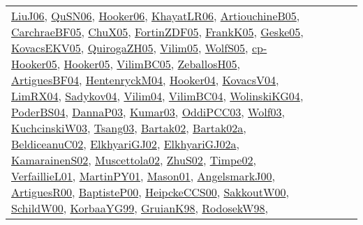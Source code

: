 {\begin{longtable}{lp{3cm}>{\raggedright}p{6cm}>{\raggedright}p{6cm}p{8cm}}
\href{papers/LiuJ06.pdf}{LiuJ06}\cite{LiuJ06}, \href{papers/QuSN06.pdf}{QuSN06}\cite{QuSN06}, \href{articles/Hooker06.pdf}{Hooker06}\cite{Hooker06}, \href{articles/KhayatLR06.pdf}{KhayatLR06}\cite{KhayatLR06}, \href{papers/ArtiouchineB05.pdf}{ArtiouchineB05}\cite{ArtiouchineB05}, \href{papers/CarchraeBF05.pdf}{CarchraeBF05}\cite{CarchraeBF05}, \href{papers/ChuX05.pdf}{ChuX05}\cite{ChuX05}, \href{papers/FortinZDF05.pdf}{FortinZDF05}\cite{FortinZDF05}, \href{papers/FrankK05.pdf}{FrankK05}\cite{FrankK05}, \href{papers/Geske05.pdf}{Geske05}\cite{Geske05}, \href{papers/KovacsEKV05.pdf}{KovacsEKV05}\cite{KovacsEKV05}, \href{papers/QuirogaZH05.pdf}{QuirogaZH05}\cite{QuirogaZH05}, \href{papers/Vilim05.pdf}{Vilim05}\cite{Vilim05}, \href{papers/WolfS05.pdf}{WolfS05}\cite{WolfS05}, \href{papers/cp-Hooker05.pdf}{cp-Hooker05}\cite{cp-Hooker05}, \href{articles/Hooker05.pdf}{Hooker05}\cite{Hooker05}, \href{articles/VilimBC05.pdf}{VilimBC05}\cite{VilimBC05}, \href{articles/ZeballosH05.pdf}{ZeballosH05}\cite{ZeballosH05}, \href{papers/ArtiguesBF04.pdf}{ArtiguesBF04}\cite{ArtiguesBF04}, \href{papers/HentenryckM04.pdf}{HentenryckM04}\cite{HentenryckM04}, \href{papers/Hooker04.pdf}{Hooker04}\cite{Hooker04}, \href{papers/KovacsV04.pdf}{KovacsV04}\cite{KovacsV04}, \href{papers/LimRX04.pdf}{LimRX04}\cite{LimRX04}, \href{papers/Sadykov04.pdf}{Sadykov04}\cite{Sadykov04}, \href{papers/Vilim04.pdf}{Vilim04}\cite{Vilim04}, \href{papers/VilimBC04.pdf}{VilimBC04}\cite{VilimBC04}, \href{papers/WolinskiKG04.pdf}{WolinskiKG04}\cite{WolinskiKG04}, \href{articles/PoderBS04.pdf}{PoderBS04}\cite{PoderBS04}, \href{papers/DannaP03.pdf}{DannaP03}\cite{DannaP03}, \href{papers/Kumar03.pdf}{Kumar03}\cite{Kumar03}, \href{papers/OddiPCC03.pdf}{OddiPCC03}\cite{OddiPCC03}, \href{papers/Wolf03.pdf}{Wolf03}\cite{Wolf03}, \href{articles/KuchcinskiW03.pdf}{KuchcinskiW03}\cite{KuchcinskiW03}, \href{articles/Tsang03.pdf}{Tsang03}\cite{Tsang03}, \href{papers/Bartak02.pdf}{Bartak02}\cite{Bartak02}, \href{papers/Bartak02a.pdf}{Bartak02a}\cite{Bartak02a}, \href{papers/BeldiceanuC02.pdf}{BeldiceanuC02}\cite{BeldiceanuC02}, \href{papers/ElkhyariGJ02.pdf}{ElkhyariGJ02}\cite{ElkhyariGJ02}, \href{papers/ElkhyariGJ02a.pdf}{ElkhyariGJ02a}\cite{ElkhyariGJ02a}, \href{papers/KamarainenS02.pdf}{KamarainenS02}\cite{KamarainenS02}, \href{papers/Muscettola02.pdf}{Muscettola02}\cite{Muscettola02}, \href{papers/ZhuS02.pdf}{ZhuS02}\cite{ZhuS02}, \href{articles/Timpe02.pdf}{Timpe02}\cite{Timpe02}, \href{papers/VerfaillieL01.pdf}{VerfaillieL01}\cite{VerfaillieL01}, \href{articles/MartinPY01.pdf}{MartinPY01}\cite{MartinPY01}, \href{articles/Mason01.pdf}{Mason01}\cite{Mason01}, \href{papers/AngelsmarkJ00.pdf}{AngelsmarkJ00}\cite{AngelsmarkJ00}, \href{articles/ArtiguesR00.pdf}{ArtiguesR00}\cite{ArtiguesR00}, \href{articles/BaptisteP00.pdf}{BaptisteP00}\cite{BaptisteP00}, \href{articles/HeipckeCCS00.pdf}{HeipckeCCS00}\cite{HeipckeCCS00}, \href{articles/SakkoutW00.pdf}{SakkoutW00}\cite{SakkoutW00}, \href{articles/SchildW00.pdf}{SchildW00}\cite{SchildW00}, \href{papers/KorbaaYG99.pdf}{KorbaaYG99}\cite{KorbaaYG99}, \href{papers/GruianK98.pdf}{GruianK98}\cite{GruianK98}, \href{papers/RodosekW98.pdf}{RodosekW98}\cite{RodosekW98}, 
\end{longtable}}
